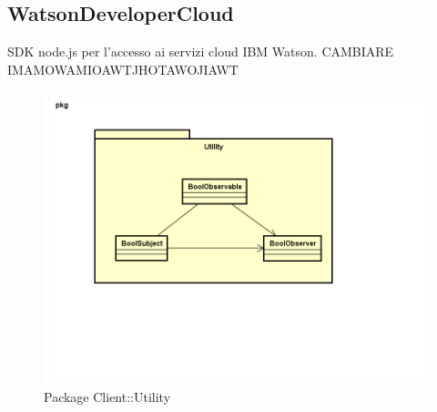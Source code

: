 \subsection{WatsonDeveloperCloud}
SDK node.js per l'accesso ai servizi cloud IBM Watson. CAMBIARE IMAMOWAMIOAWTJHOTAWOJIAWT
\begin{figure}[h] \centering \includegraphics[width=\textwidth,height=\textheight,keepaspectratio]{images/diagrams/client/Client/Utility.png}
\caption{Package Client::Utility}
\end{figure}
\newpage